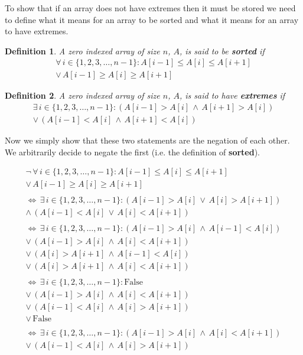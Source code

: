 \documentclass[12pt]{article}
\newtheorem*{definition}{Definition}
\begin{document}
To show that if an array does not have extremes then it must be
stored we need to define what it means for an array to be sorted
and what it means for an array to have extremes.

\begin{definition}
  A zero indexed array of size $n$, $A$, is said to be
  \textbf{sorted} if
  \begin{align*}
    \forall \, i \in \{1,2,3,\ldots,n-1\} :
    A[i-1] \leq A[i] \leq A[i+1] \\
    \vee \,
    A[i-1] \geq A[i] \geq A[i+1]
  \end{align*}
\end{definition}

\begin{definition}
  A zero indexed array of size $n$, $A$, is said to have
  \textbf{extremes} if
  \begin{align*}
    \exists \, i \in \{1,2,3,\ldots,n-1\} :
    (A[i-1] > A[i] \, \wedge \, A[i+1] > A[i]) \\ 
    \vee \,
    (A[i-1] < A[i] \, \wedge \, A[i+1] < A[i])
  \end{align*}
\end{definition}

Now we simply show that these two statements are the negation of
each other. We arbitrarily decide to negate the first (i.e. the
definition of \textbf{sorted}).

\begin{align*}
  \neg \, \forall \, i \in \{1,2,3,\ldots,n-1\} :
  A[i-1] \leq A[i] \leq A[i+1] \\
  \vee \,
  A[i-1] \geq A[i] \geq A[i+1] \\\\
  \Longleftrightarrow \, \exists \, i \in \{1,2,3,\ldots,n-1\} :
  (A[i-1] > A[i] \, \vee \, A[i] > A[i+1]) \\
  \wedge \,
  (A[i-1] < A[i] \, \vee \, A[i] < A[i+1]) \\\\
  \Longleftrightarrow \, \exists \, i \in \{1,2,3,\ldots,n-1\} :
  (A[i-1] > A[i] \, \wedge \, A[i-1] < A[i]) \\
  \vee \,
  (A[i-1] > A[i] \, \wedge \, A[i] < A[i+1]) \\
  \vee \,
  (A[i] > A[i + 1] \, \wedge \, A[i-1] < A[i]) \\
  \vee \,
  (A[i] > A[i + 1] \, \wedge \, A[i] < A[i+1]) \\\\
  \Longleftrightarrow \, \exists \, i \in \{1,2,3,\ldots,n-1\} :
  \text{False} \\
  \vee \,
  (A[i-1] > A[i] \, \wedge \, A[i] < A[i+1]) \\
  \vee \,
  (A[i-1] < A[i] \, \wedge \, A[i] > A[i + 1]) \\
  \vee \,
  \text{False} \\\\
  \Longleftrightarrow \, \exists \, i \in \{1,2,3,\ldots,n-1\} :
  (A[i-1] > A[i] \, \wedge \, A[i] < A[i+1]) \\
  \vee \,
  (A[i-1] < A[i] \, \wedge \, A[i] > A[i + 1])
\end{align*}
\end{document}
